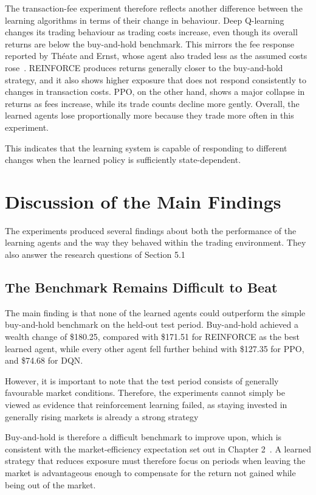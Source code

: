 The transaction-fee experiment therefore reflects another difference
between the learning algorithms in terms of their change in behaviour.
Deep Q-learning changes its trading behaviour as trading costs increase,
even though its overall returns are below the buy-and-hold benchmark. This mirrors the fee response reported by Th\'eate and Ernst, whose agent also traded less as the assumed costs rose~\cite{theate2021}.
REINFORCE produces returns generally closer to the buy-and-hold
strategy, and it also shows higher exposure that does not respond
consistently to changes in transaction costs. PPO, on the other hand,
shows a major collapse in returns as fees increase, while its trade
counts decline more gently. Overall, the learned agents lose
proportionally more because they trade more often in this experiment.

This indicates that the learning system is capable of responding to
different changes when the learned policy is sufficiently
state-dependent.

\section{Discussion of the Main Findings}

The experiments produced several findings about both the performance of
the learning agents and the way they behaved within the trading
environment. They also answer the research questions of Section 5.1

\subsection{The Benchmark Remains Difficult to Beat}

The main finding is that none of the learned agents could outperform the
simple buy-and-hold benchmark on the held-out test period. Buy-and-hold
achieved a wealth change of \$180.25, compared with \$171.51 for
REINFORCE as the best learned agent, while every other agent fell
further behind with \$127.35 for PPO, and \$74.68 for DQN.

However, it is important to note that the test period consists of
generally favourable market conditions. Therefore, the experiments
cannot simply be viewed as evidence that reinforcement learning failed,
as staying invested in generally rising markets is already a strong
strategy

Buy-and-hold is therefore a difficult benchmark to improve upon, which is consistent with the market-efficiency expectation set out in Chapter 2~\cite{fama1970}. A
learned strategy that reduces exposure must therefore focus on periods
when leaving the market is advantageous enough to compensate for the
return not gained while being out of the market.

